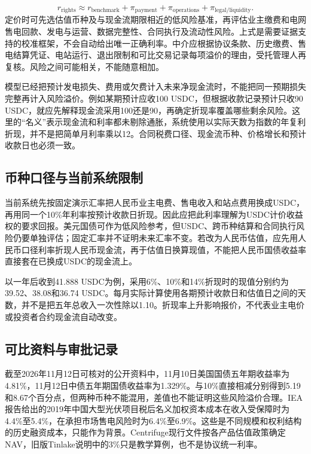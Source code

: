 \documentclass[12pt,a4paper]{article}
\begin{document}
\[r_{\mathrm{rights}}\approx r_{\mathrm{benchmark}}+\pi_{\mathrm{payment}}+\pi_{\mathrm{operations}}+\pi_{\mathrm{legal/liquidity}}.\]
定价时可先选估值币种及与现金流期限相近的低风险基准，再评估业主缴费和电网售电回款、发电与运营、数据完整性、合同执行及流动性风险。上式是需要证据支持的校准框架，不会自动给出唯一正确利率。中介应根据协议条款、历史缴费、售电结算凭证、电站运行、退出限制和可比交易记录每项溢价的理由，受托管理人再复核。风险之间可能相关，不能随意相加。

模型已经把预计发电损失、费用或欠费计入未来净现金流时，不能把同一预期损失完整再计入风险溢价。例如某期预计应收100 USDC，但根据收款记录预计只收90 USDC，就应先解释现金流采用100还是90，再确定折现率覆盖哪些剩余风险。这里的“名义”表示现金流和利率都未剔除通胀，系统使用以实际天数为指数的年复利折现，并不是把简单月利率乘以12。合同税费口径、现金流币种、价格增长和预计收款日也必须一致。

\subsection{币种口径与当前系统限制}
当前系统先按固定演示汇率把人民币业主电费、售电收入和站点费用换成USDC，再用同一个10\%年利率按预计收款日折现。因此应把此利率理解为USDC计价收益权的要求回报。美元国债可作为低风险参考，但USDC、跨币种结算和合同执行风险仍要单独评估；固定汇率并不证明未来汇率不变。若改为人民币估值，应先用人民币口径利率折现人民币现金流，再于估值日换算现值，不能把人民币国债收益率直接套在已换成USDC的现金流上。

以一年后收到41.888 USDC为例，采用6\%、10\%和14\%折现时的现值分别约为39.52、38.08和36.74 USDC。每月实际计算使用各期预计收款日和估值日之间的天数，并不是把五年总收入一次性除以1.10。折现率上升影响报价，不代表业主电价或投资者合约现金流自动改变。

\subsection{可比资料与审批记录}
截至2026年11月12日可核对的公开资料中，11月10日美国国债五年期收益率为4.81\%，11月12日中债五年期国债收益率为1.329\%。与10\%直接相减分别得到5.19和8.67个百分点，但两种币种不能混用，差值也不能证明这些风险溢价合理。IEA报告给出的2019年中国大型光伏项目税后名义加权资本成本在收入受保障时为4.4\%至5.4\%，在承担市场售电风险时为6.4\%至6.9\%。这些是不同规模和权利结构的历史融资成本，只能作为背景。Centrifuge现行文件按各产品估值政策确定NAV，旧版Tinlake说明中的3\%只是教学算例，也不是协议统一利率。
\end{document}
